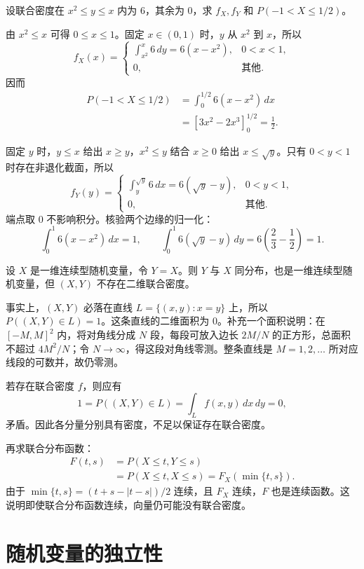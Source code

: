 \begin{example}[固定坐标求积分上下限]
设联合密度在 $x^2\leq y\leq x$ 内为 $6$，其余为 $0$，求 $f_X,f_Y$ 和 $P(-1<X\leq1/2)$。

由 $x^2\leq x$ 可得 $0\leq x\leq1$。固定 $x\in(0,1)$ 时，$y$ 从 $x^2$ 到 $x$，所以
\[
f_X(x)=
\begin{cases}
\displaystyle\int_{x^2}^x6\,dy=6(x-x^2),&0<x<1,\\
0,&\text{其他}.
\end{cases}
\]
因而
\begin{align*}
P(-1<X\leq1/2)
&=\int_0^{1/2}6(x-x^2)\,dx\\
&=[3x^2-2x^3]_0^{1/2}=\frac12.
\end{align*}

固定 $y$ 时，$y\leq x$ 给出 $x\geq y$，$x^2\leq y$ 结合 $x\geq0$ 给出 $x\leq\sqrt y$。只有 $0<y<1$ 时存在非退化截面，所以
\[
f_Y(y)=
\begin{cases}
\displaystyle\int_y^{\sqrt y}6\,dx=6(\sqrt y-y),&0<y<1,\\
0,&\text{其他}.
\end{cases}
\]
端点取 $0$ 不影响积分。核验两个边缘的归一化：
\[
\int_0^1 6(x-x^2)\,dx=1,\qquad
\int_0^1 6(\sqrt y-y)\,dy=6\left(\frac23-\frac12\right)=1.
\]
\end{example}

\begin{example}[各分量连续型不保证向量连续型]
设 $X$ 是一维连续型随机变量，令 $Y=X$。则 $Y$ 与 $X$ 同分布，也是一维连续型随机变量，但 $(X,Y)$ 不存在二维联合密度。

事实上，$(X,Y)$ 必落在直线 $L=\{(x,y):x=y\}$ 上，所以 $P((X,Y)\in L)=1$。这条直线的二维面积为 $0$。补充一个面积说明：在 $[-M,M]^2$ 内，将对角线分成 $N$ 段，每段可放入边长 $2M/N$ 的正方形，总面积不超过 $4M^2/N$；令 $N\to\infty$，得这段对角线零测。整条直线是 $M=1,2,\ldots$ 所对应线段的可数并，故仍零测。

若存在联合密度 $f$，则应有
\[
1=P((X,Y)\in L)=\int_Lf(x,y)\,dx\,dy=0,
\]
矛盾。因此各分量分别具有密度，不足以保证存在联合密度。

再求联合分布函数：
\begin{align*}
F(t,s)&=P(X\leq t,Y\leq s)\\
&=P(X\leq t,X\leq s)=F_X(\min\{t,s\}).
\end{align*}
由于 $\min\{t,s\}=(t+s-|t-s|)/2$ 连续，且 $F_X$ 连续，$F$ 也是连续函数。这说明即使联合分布函数连续，向量仍可能没有联合密度。
\end{example}

\section{随机变量的独立性}
\label{sec:independence-of-random-variables}
